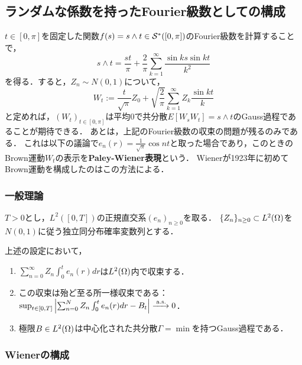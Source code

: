 \documentclass[uplatex,dvipdfmx]{jsreport}
\begin{document}
\subsection{ランダムな係数を持ったFourier級数としての構成}

\begin{tcolorbox}[colframe=ForestGreen, colback=ForestGreen!10!white,breakable,colbacktitle=ForestGreen!40!white,coltitle=black,fonttitle=\bfseries\sffamily,
title=]
    $t\in[0,\pi]$を固定した関数$f(s)=s\land t\in\mathcal{S}^*([0,\pi])$のFourier級数を計算することで，
    \[s\land t=\frac{st}{\pi}+\frac{2}{\pi}\sum^\infty_{k=1}\frac{\sin ks\sin kt}{k^2}\]
    を得る．すると，$Z_n\sim N(0,1)$について，
    \[W_t:=\frac{t}{\sqrt{\pi}}Z_0+\sqrt{\frac{2}{\pi}}\sum^\infty_{k=1}Z_k\frac{\sin kt}{k}\]
    と定めれば，$(W_t)_{t\in[0,\pi]}$は平均$0$で共分散$E[W_sW_t]=s\land t$のGauss過程であることが期待できる．
    あとは，上記のFourier級数の収束の問題が残るのみである．
    これは以下の議論で$e_n(r)=\frac{1}{\sqrt{\pi}}\cos nt$と取った場合であり，このときのBrown運動$W_t$の表示を\textbf{Paley-Wiener表現}という．
    Wienerが1923年に初めてBrown運動を構成したのはこの方法による．
\end{tcolorbox}

\subsubsection{一般理論}

\begin{notation}
    $T>0$とし，$L^2([0,T])$の正規直交系$(e_n)_{n\ge0}$を取る．
    $\{Z_n\}_{n\ge0}\subset L^2(\Omega)$を$N(0,1)$に従う独立同分布確率変数列とする．
\end{notation}

\begin{theorem}
    上述の設定において，
    \begin{enumerate}
        \item $\sum^\infty_{n=0}Z_n\int^t_0e_n(r)dr$は$L^2(\Omega)$内で収束する．
        \item この収束は殆ど至る所一様収束である：$\sup_{t\in[0,T]}\left|\sum^N_{n=0}Z_n\int^t_0e_n(r)dr-B_t\right|\xrightarrow{\;\mathrm{a.s.}}0$．
        \item 極限$B\in L^2(\Omega)$は中心化された共分散$\Gamma=\min$を持つGauss過程である．
    \end{enumerate}
\end{theorem}

\subsubsection{Wienerの構成}
\end{document}
